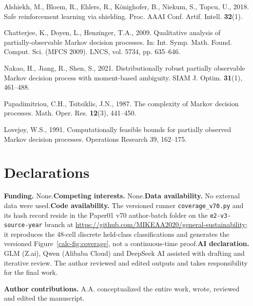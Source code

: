 \documentclass[10pt,twocolumn]{article}
\theoremstyle{definition}
\begin{document}
{Alshiekh, M., Bloem, R., Ehlers, R., K\"{o}nighofer, B., Niekum, S.,
Topcu, U., 2018. Safe reinforcement learning via shielding. Proc. AAAI
Conf. Artif. Intell. \textbf{32}(1).

Chatterjee, K., Doyen, L., Henzinger, T.A., 2009. Qualitative analysis
of partially-observable Markov decision processes. In: Int. Symp. Math.
Found. Comput. Sci. (MFCS 2009). LNCS, vol. 5734, pp. 635--646.

Nakao, H., Jiang, R., Shen, S., 2021. Distributionally robust partially
observable Markov decision process with moment-based ambiguity. SIAM J.
Optim. \textbf{31}(1), 461--488.

Papadimitriou, C.H., Tsitsiklis, J.N., 1987. The complexity of Markov
decision processes. Math. Oper. Res. \textbf{12}(3), 441--450.

Lovejoy, W.S., 1991. Computationally feasible bounds for partially
observed Markov decision processes. Operations Research 39, 162--175.
}

\section*{Declarations}

\textbf{Funding.} None.\quad \textbf{Competing interests.} None.\quad \textbf{Data availability.} No external data were used.\quad \textbf{Code availability.} The versioned runner \texttt{coverage\_v70.py} and its hash record reside in the Paper01 v70 author-batch folder on the \texttt{e2-v3-source-year} branch at \url{https://github.com/MIKEAA2020/general-sustainability}; it reproduces the 48-cell discrete held-class classifications and generates the versioned Figure~\ref{calc-fig:coverage}, not a continuous-time proof.\quad \textbf{AI declaration.} GLM (Z.ai), Qwen (Alibaba Cloud) and DeepSeek AI assisted with drafting and iterative review. The author reviewed and edited outputs and takes
responsibility for the final work.

\textbf{Author contributions.} A.A. conceptualized the entire work, wrote, reviewed and edited the manuscript.
\end{document}
